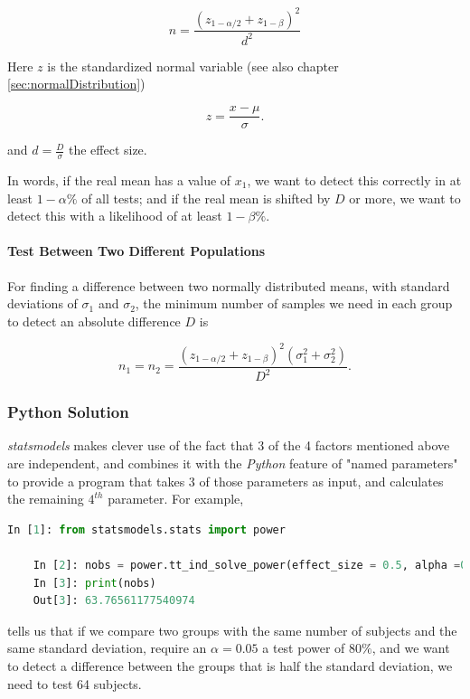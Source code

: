 \begin{equation}
  n = \frac{{({z_{1 - \alpha /2}} + {z_{1 - \beta }})}^2}{d^2}
\end{equation}

Here $z$ is the standardized normal variable (see also chapter \ref{sec:normalDistribution})

\begin{equation}
  z = \frac{x-\mu}{\sigma} .
\end{equation}

and $d = \frac{D}{\sigma}$ the effect size.

In words, if the real mean has a value of $x_1$, we want to detect this correctly in at least $1-\alpha\%$ of all tests; and if the real mean is shifted by $D$ or more, we want to detect this with a likelihood of at least $1-\beta\%$.

\paragraph{Test Between Two Different Populations}
For finding a difference between two normally distributed means, with standard deviations of $\sigma_1$ and $\sigma_2$, the minimum number of samples we need in each group to detect an absolute difference $D$ is

\begin{equation}
  {n_1} = {n_2} = \frac{{({z_{1 - \alpha /2}} + {z_{1 - \beta }})}^2(\sigma _1^2 + \sigma _2^2)}{D^2} .
\end{equation}

\subsubsection{Python Solution}

\emph{statsmodels} makes clever use of the fact that 3 of the 4 factors mentioned above are independent, and combines it with the \emph{Python} feature of "named parameters" to provide a program that takes 3 of those parameters as input, and calculates the remaining $4^{th}$ parameter. For example,

\begin{lstlisting}[language=Python]
    In [1]: from statsmodels.stats import power

    In [2]: nobs = power.tt_ind_solve_power(effect_size = 0.5, alpha =0.05, power=0.8)
    In [3]: print(nobs)
    Out[3]: 63.76561177540974
\end{lstlisting}

tells us that if we compare two groups with the same number of subjects and the same standard deviation, require an $\alpha=0.05$ a test power of $80\%$, and we want to detect a difference between the groups that is half the standard deviation, we need to test 64 subjects.

